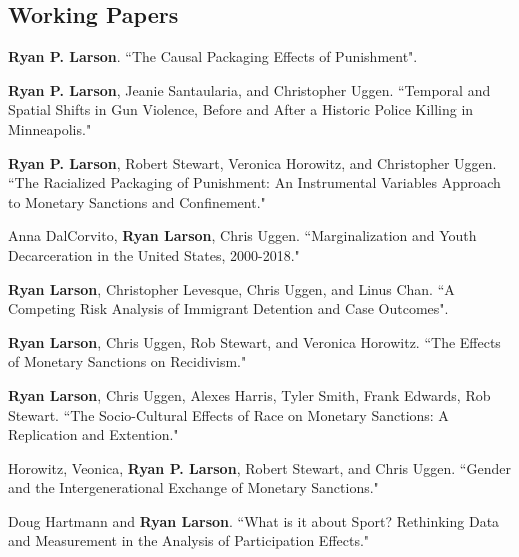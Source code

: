 \documentclass[letterpaper]{article}
\renewenvironment{itemize}{
  \begin{list}{}{
    \setlength{\leftmargin}{1.5em}
  }
}{
  \end{list}
}
\begin{document}
\subsection*{Working Papers}
\begin{itemize}

\item \textbf{Ryan P. Larson}. ``The Causal Packaging Effects of Punishment".
\item \textbf{Ryan P. Larson}, Jeanie Santaularia,  and Christopher Uggen. ``Temporal and Spatial Shifts in Gun Violence, Before and After a Historic Police Killing in Minneapolis."
\item \textbf{Ryan P. Larson}, Robert Stewart, Veronica Horowitz, and Christopher Uggen. ``The Racialized Packaging of Punishment: An Instrumental Variables Approach to Monetary Sanctions and Confinement." 
\item Anna DalCorvito, \textbf{Ryan Larson}, Chris Uggen.  ``Marginalization and Youth Decarceration in the United States, 2000-2018."
\item \textbf{Ryan Larson}, Christopher Levesque, Chris Uggen, and Linus Chan. ``A Competing Risk Analysis of Immigrant Detention and Case Outcomes".
\item \textbf{Ryan Larson},  Chris Uggen, Rob Stewart, and Veronica Horowitz. ``The Effects of Monetary Sanctions on Recidivism."
\item \textbf{Ryan Larson}, Chris Uggen, Alexes Harris, Tyler Smith, Frank Edwards, Rob Stewart. ``The Socio-Cultural Effects of Race on Monetary Sanctions: A Replication and Extention."
\item Horowitz, Veonica, \textbf{Ryan P. Larson}, Robert Stewart, and Chris Uggen. ``Gender and the Intergenerational Exchange of Monetary Sanctions."
\item Doug Hartmann and \textbf{Ryan Larson}. ``What is it about Sport? Rethinking Data and Measurement in the Analysis of Participation Effects."



\end{itemize}
\end{document}
